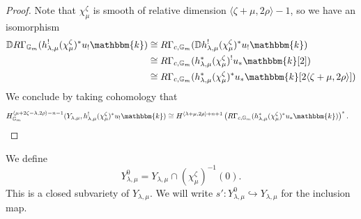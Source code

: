 \documentclass{amsart}
\newcommand{\G}{\mathbb{G}}
\renewcommand{\k}{\mathbbm{k}}
\newcommand{\DD}{\mathbb{D}}
\theoremstyle{definition}
\begin{document}
\begin{proof}
         Note that $\chi_{\mu}^{\zeta}$ is smooth of relative dimension $\langle \zeta +\mu , 2\rho \rangle - 1$, so we have an isomorphism
         \begin{align*}
            \DD R\Gamma_{\G_m} (h_{\lambda, \mu}^! (\chi_{\mu}^{\zeta})^* u_! \k) &\cong R\Gamma_{c, \G_m} (\DD h_{\lambda, \mu}^! (\chi_{\mu}^{\zeta})^* u_! \k) \\
            &\cong R\Gamma_{c, \G_m} (h_{\lambda, \mu}^* (\chi_{\mu}^{\zeta})^! u_* \k [2]) \\
            &\cong R\Gamma_{c, \G_m} (h_{\lambda, \mu}^* (\chi_{\mu}^{\zeta})^* u_* \k [2\langle \zeta + \mu,  2\rho \rangle])
         \end{align*}
         We conclude by taking cohomology that 
         \begin{align*}
            H_{\G_m}^{\langle \mu + 2\zeta - \lambda, 2\rho \rangle - n - 1} (Y_{\lambda, \mu}, h_{\lambda, \mu}^! (\chi_{\mu}^{\zeta})^* u_! \k) &\cong H^{\langle \lambda + \mu, 2\rho \rangle + n + 1} \left( R\Gamma_{c, \G_m} ( h_{\lambda, \mu}^* (\chi_{\mu}^{\zeta})^* u_* \k) \right)^*.
         \end{align*}
    \end{proof}

    We define 
    \[Y_{\lambda, \mu}^0 = Y_{\lambda, \mu} \cap (\chi_{\mu}^{\zeta})^{-1} (0).\]
    This is a closed subvariety of $Y_{\lambda, \mu}$. We will write $s' : Y_{\lambda, \mu}^0 \hookrightarrow Y_{\lambda, \mu}$ for the inclusion map.
\end{document}
